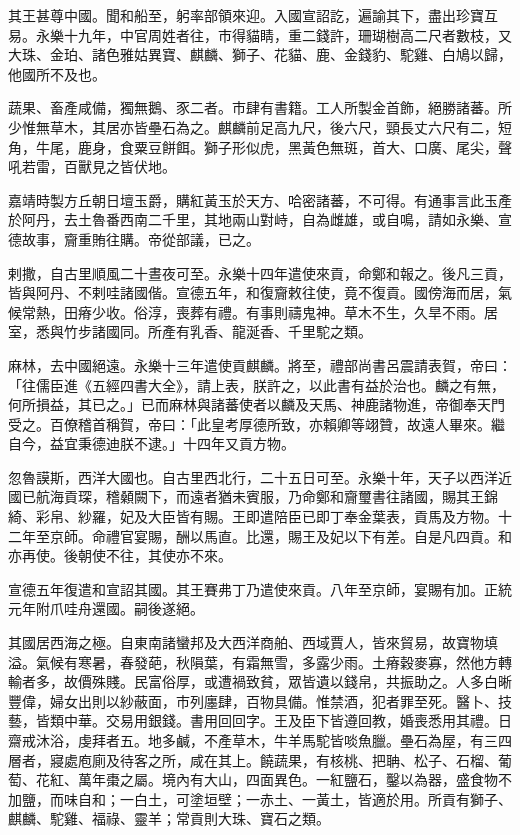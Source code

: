 \begin{pinyinscope}
其王甚尊中國。聞和船至，躬率部領來迎。入國宣詔訖，遍諭其下，盡出珍寶互易。永樂十九年，中官周姓者往，市得貓睛，重二錢許，珊瑚樹高二尺者數枝，又大珠、金珀、諸色雅姑異寶、麒麟、獅子、花貓、鹿、金錢豹、駝雞、白鳩以歸，他國所不及也。

蔬果、畜產咸備，獨無鵝、豕二者。市肆有書籍。工人所製金首飾，絕勝諸蕃。所少惟無草木，其居亦皆壘石為之。麒麟前足高九尺，後六尺，頸長丈六尺有二，短角，牛尾，鹿身，食粟豆餅餌。獅子形似虎，黑黃色無斑，首大、口廣、尾尖，聲吼若雷，百獸見之皆伏地。

嘉靖時製方丘朝日壇玉爵，購紅黃玉於天方、哈密諸蕃，不可得。有通事言此玉產於阿丹，去土魯番西南二千里，其地兩山對峙，自為雌雄，或自鳴，請如永樂、宣德故事，齎重賄往購。帝從部議，已之。

剌撒，自古里順風二十晝夜可至。永樂十四年遣使來貢，命鄭和報之。後凡三貢，皆與阿丹、不剌哇諸國偕。宣德五年，和復齎敕往使，竟不復貢。國傍海而居，氣候常熱，田瘠少收。俗淳，喪葬有禮。有事則禱鬼神。草木不生，久旱不雨。居室，悉與竹步諸國同。所產有乳香、龍涎香、千里駝之類。

麻林，去中國絕遠。永樂十三年遣使貢麒麟。將至，禮部尚書呂震請表賀，帝曰：「往儒臣進《五經四書大全》，請上表，朕許之，以此書有益於治也。麟之有無，何所損益，其已之。」已而麻林與諸蕃使者以麟及天馬、神鹿諸物進，帝御奉天門受之。百僚稽首稱賀，帝曰：「此皇考厚德所致，亦賴卿等翊贊，故遠人畢來。繼自今，益宜秉德迪朕不逮。」十四年又貢方物。

忽魯謨斯，西洋大國也。自古里西北行，二十五日可至。永樂十年，天子以西洋近國已航海貢琛，稽顙闕下，而遠者猶未賓服，乃命鄭和齎璽書往諸國，賜其王錦綺、彩帛、紗羅，妃及大臣皆有賜。王即遣陪臣已即丁奉金葉表，貢馬及方物。十二年至京師。命禮官宴賜，酬以馬直。比還，賜王及妃以下有差。自是凡四貢。和亦再使。後朝使不往，其使亦不來。

宣德五年復遣和宣詔其國。其王賽弗丁乃遣使來貢。八年至京師，宴賜有加。正統元年附爪哇舟還國。嗣後遂絕。

其國居西海之極。自東南諸蠻邦及大西洋商舶、西域賈人，皆來貿易，故寶物填溢。氣候有寒暑，春發葩，秋隕葉，有霜無雪，多露少雨。土瘠穀麥寡，然他方轉輸者多，故價殊賤。民富俗厚，或遭禍致貧，眾皆遺以錢帛，共振助之。人多白晰豐偉，婦女出則以紗蔽面，市列廛肆，百物具備。惟禁酒，犯者罪至死。醫卜、技藝，皆類中華。交易用銀錢。書用回回字。王及臣下皆遵回教，婚喪悉用其禮。日齋戒沐浴，虔拜者五。地多鹹，不產草木，牛羊馬駝皆啖魚臘。壘石為屋，有三四層者，寢處庖廁及待客之所，咸在其上。饒蔬果，有核桃、把聃、松子、石榴、葡萄、花紅、萬年棗之屬。境內有大山，四面異色。一紅鹽石，鑿以為器，盛食物不加鹽，而味自和；一白土，可塗垣壁；一赤土、一黃土，皆適於用。所貢有獅子、麒麟、駝雞、福祿、靈羊；常貢則大珠、寶石之類。


\end{pinyinscope}
